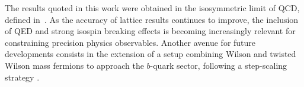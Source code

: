The results quoted in this work were obtained in the isosymmetric limit of QCD, defined in~\citep{FlavourLatticeAveragingGroupFLAG:2021npn}. As the accuracy of lattice results continues to improve, the inclusion of QED and strong isospin breaking effects is becoming increasingly relevant for constraining precision physics observables. Another avenue for future developments consists in the extension of a setup combining Wilson and twisted Wilson mass fermions to approach  the $b$-quark sector, following a step-scaling strategy \cite{Sommer:2023gap}.


